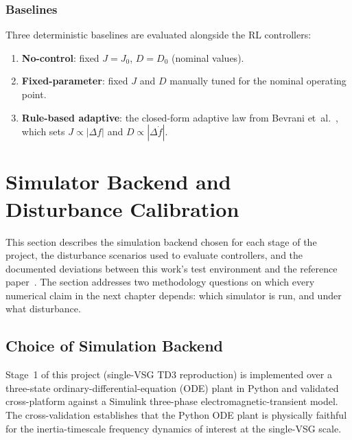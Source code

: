 \documentclass{unnc-fyp}
\begin{document}
\subsubsection{Baselines}

Three deterministic baselines are evaluated alongside the RL controllers:
\begin{enumerate}
  \item \textbf{No-control}: fixed $J = J_0$, $D = D_0$ (nominal values).
  \item \textbf{Fixed-parameter}: fixed $J$ and $D$ manually tuned for
        the nominal operating point.
  \item \textbf{Rule-based adaptive}: the closed-form adaptive law from
        Bevrani et~al.~\cite{bevrani2014vsg}, which sets
        $J \propto |\Delta f|$ and $D \propto |\Delta\dot{f}|$.
\end{enumerate}

\section{Simulator Backend and Disturbance Calibration}
\label{sec:simulator-backend}

This section describes the simulation backend chosen for each
stage of the project, the disturbance scenarios used to evaluate
controllers, and the documented deviations between this work's
test environment and the reference paper~\cite{yang2023ddic}.
The section addresses two methodology questions on which every
numerical claim in the next chapter depends: which simulator is
run, and under what disturbance.

\subsection{Choice of Simulation Backend}
\label{sec:backend-choice}

Stage~1 of this project (single-VSG TD3 reproduction) is
implemented over a three-state ordinary-differential-equation
(ODE) plant in Python and validated cross-platform against a
Simulink three-phase electromagnetic-transient model.
The cross-validation establishes that the Python ODE plant is
physically faithful for the inertia-timescale frequency dynamics
of interest at the single-VSG scale.
\end{document}
